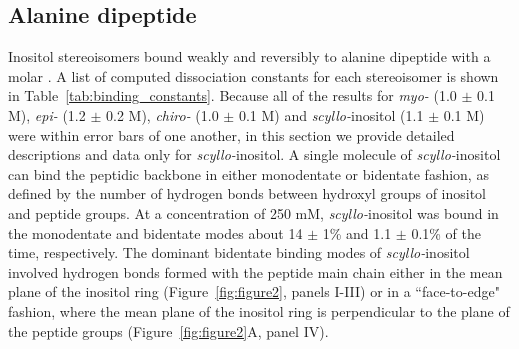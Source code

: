 \subsection{Alanine dipeptide}
Inositol stereoisomers bound weakly and reversibly to alanine dipeptide with a molar \KD. A list of computed dissociation constants for each stereoisomer is shown in Table~\ref{tab:binding_constants}. Because all of the results for \textit{myo-} (1.0 $\pm$ 0.1 M), \textit{epi-} (1.2 $\pm$ 0.2 M), \textit{chiro-} (1.0 $\pm$ 0.1 M) and \textit{scyllo-}inositol (1.1 $\pm$ 0.1 M) were within error bars of one another, in this section we provide detailed descriptions and data only for \textit{scyllo-}inositol. A single molecule of \textit{scyllo-}inositol can bind the peptidic backbone in either monodentate or bidentate fashion, as defined by the number of hydrogen bonds between hydroxyl groups of inositol and peptide groups. At a concentration of 250 mM, \textit{scyllo-}inositol was bound in the monodentate and bidentate modes about 14 $\pm$ 1\% and 1.1 $\pm$ 0.1\% of the time, respectively. The dominant bidentate binding modes of \textit{scyllo-}inositol involved hydrogen bonds formed with the peptide main chain either in the mean plane of the inositol ring (Figure~\ref{fig:figure2}, panels I-III) or in a ``face-to-edge" fashion, where the mean plane of the inositol ring is perpendicular to the plane of the peptide groups (Figure~\ref{fig:figure2}A, panel IV).
	
